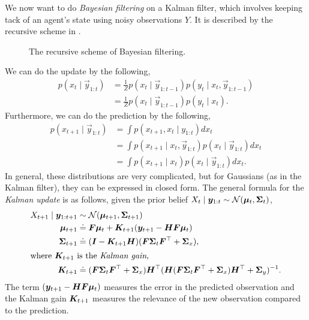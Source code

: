 We now want to do \textit{Bayesian filtering} on a Kalman filter, which involves
keeping tack of an agent's state using noisy observations $Y$. It is described
by the recursive scheme in .

\begin{figure}[h!]
    \centering
    \caption{The recursive scheme of Bayesian filtering.}
    \label{fig:bayesian-filtering}
\end{figure}

We can do the update by the following,
\begin{align*}
    p(x_t \mid \vec{y}_{1:t}) & = \frac{1}{Z} p(x_t \mid \vec{y}_{1:t-1}) p(y_t\mid x_t, \vec{y}_{1:t-1}) \\
                              & = \frac{1}{Z} p(x_t \mid \vec{y}_{1:t-1}) p(y_t\mid x_t)
    .\end{align*}
Furthermore, we can do the prediction by the following,
\begin{align*}
    p(x_{t+1}\mid \vec{y}_{1:t}) & = \int p(x_{t+1}, x_t \mid y_{1:t}) dx_t                                \\
                                 & = \int p(x_{t+1} \mid x_t, \vec{y}_{1:t}) p(x_t\mid \vec{y}_{1:t}) dx_t \\
                                 & = \int p(x_{t+1} \mid x_t) p(x_t\mid \vec{y}_{1:t}) dx_t.
\end{align*}
In general, these distributions are very complicated, but for Gaussians (as in
the Kalman filter), they can be expressed in closed form. The general formula
for the \textit{Kalman update} is as follows, given the prior belief $X_t \mid
    \bm{y}_{1:t} \sim \mathcal{N}(\bm{\mu}_t, \bm{\Sigma}_t)$,
\begin{align*}
    X_{t+1} \mid \bm{y}_{1:t+1} & \sim \mathcal{N}(\bm{\mu}_{t+1}, \bm{\Sigma}_{t+1})                                                                                                                                                    \\
    \bm{\mu}_{t+1}              & \doteq \bm{F} \bm{\mu}_t + \bm{K}_{t+1}(\bm{y}_{t+1} - \bm{H}\bm{F} \bm{\mu}_t)                                                                                                                   \\
    \bm{\Sigma}_{t+1}           & \doteq (\bm{I} - \bm{K}_{t+1} \bm{H}) (\bm{F}\bm{\Sigma}_t\bm{F}^\top + \bm{\Sigma}_x),                                                                                                    \\
    \intertext{where $\bm{K}_{t+1}$ is the \textit{Kalman gain},}
    \bm{K}_{t+1}                & \doteq (\bm{F}\bm{\Sigma}_t \bm{F}^\top + \bm{\Sigma}_x) \bm{H}^\top (\bm{H}(\bm{F}\bm{\Sigma}_t\bm{F}^\top + \bm{\Sigma}_x) \bm{H}^\top + \bm{\Sigma}_y)^{-1}.
\end{align*}
The term $(\bm{y}_{t+1} - \bm{H}\bm{F}\bm{\mu}_t)$ measures the error in the
predicted observation and the Kalman gain $\bm{K}_{t+1}$ measures the relevance
of the new observation compared to the prediction.

